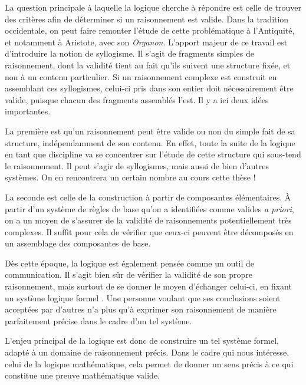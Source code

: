 La question principale à laquelle la logique cherche à répondre
est celle de trouver des critères afin de déterminer si un raisonnement est valide.
Dans la tradition occidentale, on peut faire remonter l’étude de cette problématique
à l’Antiquité, et notamment à Aristote, avec son \textit{Organon}.
L’apport majeur de ce travail est d’introduire la notion de syllogisme.
Il s’agit de fragments simples de raisonnement, dont la validité tient au fait qu’ils
suivent une structure fixée, et non à un contenu particulier.%
Si un raisonnement complexe est construit en assemblant ces syllogismes,
celui-ci pris dans son entier doit nécessairement être valide, puisque
chacun des fragments assemblés l’est. Il y a ici deux idées importantes.

La première est qu'un raisonnement peut être valide ou non du simple fait de sa structure, indépendamment de son contenu.
En effet, toute la suite de la logique en tant que discipline va se concentrer sur l’étude
de cette structure qui sous-tend le raisonnement.
Il peut s’agir de syllogismes, mais aussi de bien d’autres systèmes. On en rencontrera
un certain nombre au cours cette thèse !

La seconde est celle de la construction à partir de composantes élémentaires. À
partir d’un système de règles de base qu’on a identifiées comme valides 
\textit{a priori}, on a un moyen de s’assurer de la validité
de raisonnements potentiellement très complexes.
Il suffit pour cela de vérifier que ceux-ci peuvent être décomposés en un
assemblage des composantes de base.

Dès cette époque, la logique est également pensée comme un outil de communication.
Il s’agit bien sûr de vérifier la validité de son propre raisonnement,
mais surtout de se donner le moyen d’échanger celui-ci,
en fixant un système logique formel%
.
Une personne voulant que ses conclusions soient acceptées par d’autres n’a plus qu’à
exprimer son raisonnement de manière parfaitement précise dans le cadre d’un tel système.

L’enjeu principal de la logique est donc de construire un tel système formel,
adapté à un domaine de raisonnement précis. Dans le cadre qui nous intéresse,
celui de la logique mathématique, cela permet de donner un sens précis à
ce qui constitue une preuve mathématique valide.

